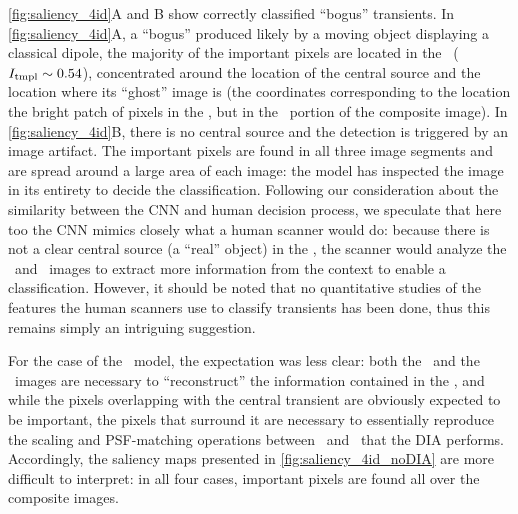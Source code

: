 \autoref{fig:saliency_4id}A and B show correctly classified ``bogus'' transients. In \autoref{fig:saliency_4id}A, a ``bogus'' produced likely by a moving object displaying a classical dipole, the majority of the important pixels are located in the \temp\ ($I_\mathrm{tmpl} \sim 0.54 $), concentrated around the location of the central source and the location  where its ``ghost'' image is (the coordinates corresponding to the location the bright patch of pixels in the \diff, but in the \temp\ portion of the composite image).
In \autoref{fig:saliency_4id}B, there is no central source and the detection is triggered by an image artifact. The important pixels are found in all three image segments and are spread around a large area of each image: the model has inspected the image in its entirety to decide the classification. 
Following our consideration about the similarity between the CNN and human decision process, we speculate that here too the CNN  mimics closely what a human scanner would do: because there is not a clear central source (a ``real'' object) in the \diff, the scanner would analyze the \search\ and \temp\ images to extract more information from the context to enable a classification. However, it should be noted that no quantitative studies of the features the human scanners use to classify transients has been done, thus this remains simply an intriguing suggestion.



For the case of the \nodia\ model, the expectation was less clear: both the \search\ and the \temp\ images are necessary to ``reconstruct'' the information contained in the \diff, and while the pixels overlapping with the central transient are obviously expected to be important, the pixels that surround it are necessary to essentially reproduce the scaling and PSF-matching operations between \temp\ and \search\ that the DIA performs. 
Accordingly, the saliency maps presented in \autoref{fig:saliency_4id_noDIA} are more difficult to interpret: in all four cases, important pixels are found all over the composite images.

